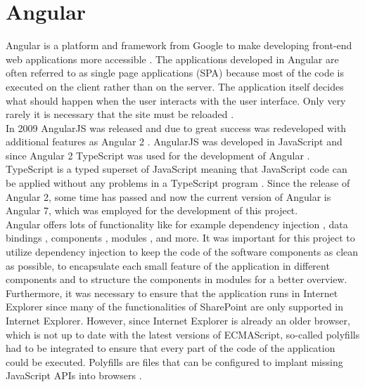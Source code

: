 \documentclass[Bachelor,BIF,english]{twbook}
\begin{document}
\section{Angular}
Angular is a platform and framework from Google to make developing front-end web applications more accessible \cite[p.~109]{YakovFainAngular}. The applications developed in Angular are often referred to as single page applications (SPA) because most of the code is executed on the client rather than on the server. The application itself decides what should happen when the user interacts with the user interface. Only very rarely it is necessary that the site must be reloaded \cite[p.~xxiv,~3]{RxAngular5Prj}.
\\[\baselineskip]
In 2009 AngularJS was released and due to great success was redeveloped with additional features as Angular 2 \cite[p.~109]{YakovFainAngular} \cite[p.~15]{RxAngular5Prj}. AngularJS was developed in JavaScript and since Angular 2 TypeScript \cite{TypeScript} was used for the development of Angular \cite[p.~xxiv]{RxAngular5Prj}. TypeScript is a typed superset of JavaScript meaning that JavaScript code can be applied without any problems in a TypeScript program \cite[p.~41]{RxAngular5Prj}. Since the release of Angular 2, some time has passed and now the current version of Angular is Angular 7, which was employed for the development of this project.
\\[\baselineskip]
Angular offers lots of functionality like for example dependency injection \cite[p.~211]{RxAngular5Prj}, data bindings \cite[p.~111]{YakovFainAngular}, components \cite[p.~89]{RxAngular5Prj}, modules \cite[p.~115]{RxAngular5Prj}, and more. It was important for this project to utilize dependency injection to keep the code of the software components as clean as possible, to encapsulate each small feature of the application in different components and to structure the components in modules for a better overview. 
\\[\baselineskip]
Furthermore, it was necessary to ensure that the application runs in Internet Explorer \cite{IE} since many of the functionalities of SharePoint are only supported in Internet Explorer. However, since Internet Explorer is already an older browser, which is not up to date with the latest versions of ECMAScript, so-called polyfills had to be integrated to ensure that every part of the code of the application could be executed. Polyfills are files that can be configured to implant missing JavaScript APIs into browsers \cite[p.~18]{RxAngular5Prj}.
\\[\baselineskip]
\end{document}

